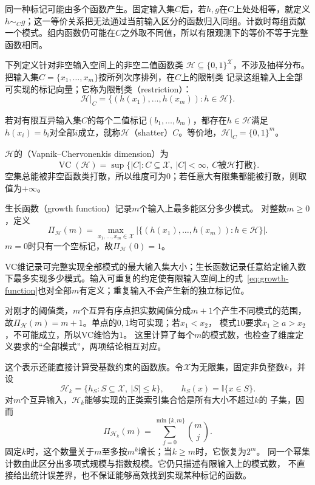 同一种标记可能由多个函数产生。固定输入集$C$后，若$h,g$在$C$上处处相等，就定义$h\sim_Cg$；这一等价关系把无法通过当前输入区分的函数归入同组。计数时每组贡献一个模式。组内函数仍可能在$C$之外取不同值，所以有限观测下的等价不等于完整函数相同。

下列定义针对非空输入空间上的非空二值函数类
\(\mathcal H\subseteq\{0,1\}^{\mathcal X}\)，不涉及抽样分布。
把输入集\(C=\{x_1,\ldots,x_m\}\)按所列次序排列，在\(C\)上的限制类
记录这组输入上全部可实现的标记向量；它称为限制类（restriction）：
\[
  \mathcal H|_C=\{(h(x_1),\ldots,h(x_m)):h\in\mathcal H\}.
\]
\begin{definition}[打散]
  \label{def:shattering}
  若对有限互异输入集\(C\)的每个二值标记\((b_1,\ldots,b_m)\)，都存在\(h\in\mathcal H\)满足\(h(x_i)=b_i\)对全部\(i\)成立，就称\(\mathcal H\)（shatter）\(C\)。等价地，\(\mathcal H|_C=\{0,1\}^m\)。
\end{definition}
\begin{definition}[VC维]
  \label{def:vc-dimension}
  \(\mathcal H\)的（Vapnik--Chervonenkis dimension）为
  \[
    \operatorname{VC}(\mathcal H)
    =\sup\{|C|:C\subseteq\mathcal X,\ |C|<\infty,\ C\text{被}\mathcal H\text{打散}\}.
  \]
  空集总能被非空函数类打散，所以维度可为\(0\)；若任意大有限集都能被打散，则取值为\(+\infty\)。
\end{definition}
\begin{definition}[生长函数]
  \label{def:growth-function}
  生长函数（growth function）记录$m$个输入上最多能区分多少模式。
  对整数\(m\geq0\)，定义
  \begin{equation}
    \Pi_{\mathcal H}(m)
    =\max_{x_1,\ldots,x_m\in\mathcal X}
    |\{(h(x_1),\ldots,h(x_m)):h\in\mathcal H\}|.
    \label{eq:growth-function}
  \end{equation}
  \(m=0\)时只有一个空标记，故\(\Pi_{\mathcal H}(0)=1\)。
\end{definition}
VC维记录可完整实现全部模式的最大输入集大小；生长函数记录任意给定输入数下最多实现多少模式。输入可重复的约定使有限输入空间上的式~\eqref{eq:growth-function}也对全部\(m\)有定义；重复输入不会产生新的独立标记位。

对刚才的阈值类，$m$个互异有序点把实数阈值分成$m+1$个产生不同模式的范围，
故$\Pi_{\mathcal H}(m)=m+1$。单点的$0,1$均可实现；若$x_1<x_2$，
模式$10$要求$x_1\geq a>x_2$，不可能成立，所以VC维恰为$1$。
这里计算了每个$m$的模式数，也检查了维度定义要求的“全部模式”，两项结论相互对应。

这个表示还能直接计算受基数约束的函数族。令$\mathcal{X}$为无限集，固定非负整数$k$，并设
\[
  \mathcal{H}_k
  =
  \{h_S:S\subseteq\mathcal{X},\ |S|\leq k\},
  \qquad
  h_S(x)=\mathbb{I}\{x\in S\}.
\]
对$m$个互异输入，$\mathcal{H}_k$能够实现的正类索引集合恰是所有大小不超过$k$的
子集，因而
\[
  \Pi_{\mathcal{H}_k}(m)
  =
  \sum_{j=0}^{\min\{k,m\}}\binom{m}{j}.
\]
固定$k$时，这个数量关于$m$至多按$m^k$增长；当$k\geq m$时，它恢复为$2^m$。
同一个幂集计数由此区分出多项式规模与指数规模。它仍只描述有限输入上的模式数，
不直接给出统计误差界，也不保证能够高效找到实现某种标记的函数。

